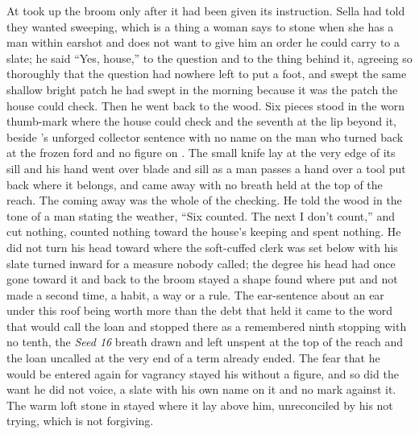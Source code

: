 \scenebreak

At   took up the broom only after it had been given its instruction. Sella had told  they wanted sweeping, which is a thing a woman says to stone when she has a man within earshot and does not want to give him an order he could carry to a slate; he said “Yes, house,” to the question and to the thing behind it, agreeing so thoroughly that the question had nowhere left to put a foot, and swept the same shallow bright patch he had swept in the morning because it was the patch the house could check. Then he went back to the wood. Six pieces stood in the worn thumb-mark where the house could check and the seventh at the lip beyond it, beside 's unforged collector sentence with no name on the man who turned back at the frozen ford and no figure on . The small knife lay at the very edge of its sill and his hand went over blade and sill as a man passes a hand over a tool put back where it belongs, and came away with no breath held at the top of the reach. The coming away was the whole of the checking. He told the wood in the tone of a man stating the weather, “Six counted. The next I don't count,” and cut nothing, counted nothing toward the house's keeping and spent nothing. He did not turn his head toward  where the soft-cuffed clerk was set below  with his slate turned inward for a measure nobody called; the degree his head had once gone toward it and back to the broom stayed a shape found where put and not made a second time, a habit, a way or a rule. The ear-sentence about an ear under this roof being worth more than the debt that held it came to the word that would call the loan and stopped there as a remembered ninth stopping with no tenth, the \emph{Seed 16} breath drawn and left unspent at the top of the reach and the loan uncalled at the very end of a term already ended. The fear that he would be entered again for vagrancy stayed his without a figure, and so did the want he did not voice, a slate with his own name on it and no mark against it. The warm loft stone in  stayed where it lay above him, unreconciled by his not trying, which is not forgiving.

